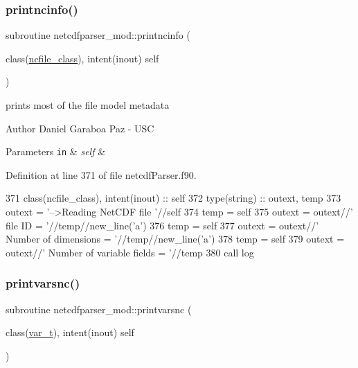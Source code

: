 \subsubsection{\texorpdfstring{printncinfo()}{printncinfo()}}
{\footnotesize\ttfamily subroutine netcdfparser\+\_\+mod\+::printncinfo (\begin{DoxyParamCaption}\item[{class(\mbox{\hyperlink{structnetcdfparser__mod_1_1ncfile__class}{ncfile\+\_\+class}}), intent(inout)}]{self }\end{DoxyParamCaption})\hspace{0.3cm}{\ttfamily [private]}}



prints most of the file model metadata 

\begin{DoxyAuthor}{Author}
Daniel Garaboa Paz -\/ U\+SC 
\end{DoxyAuthor}

\begin{DoxyParams}[1]{Parameters}
\mbox{\tt in}  & {\em self} & \\
\hline
\end{DoxyParams}


Definition at line 371 of file netcdf\+Parser.\+f90.


\begin{DoxyCode}
371     \textcolor{keywordtype}{class}(ncfile\_class), \textcolor{keywordtype}{intent(inout)} :: self
372     \textcolor{keywordtype}{type}(string) :: outext, temp
373     outext = \textcolor{stringliteral}{'-->Reading NetCDF file '}//self%
374     temp = self%
375     outext = outext//\textcolor{stringliteral}{'       file ID = '}//temp//new\_line(\textcolor{stringliteral}{'a'})
376     temp = self%
377     outext = outext//\textcolor{stringliteral}{'       Number of dimensions = '}//temp//new\_line(\textcolor{stringliteral}{'a'})
378     temp = self%
379     outext = outext//\textcolor{stringliteral}{'       Number of variable fields = '}//temp
380     \textcolor{keyword}{call }log%
\end{DoxyCode}
\mbox{\label{namespacenetcdfparser__mod_a6b57fa47d7bd796c75483216a51e5e04}} 
\subsubsection{\texorpdfstring{printvarsnc()}{printvarsnc()}}
{\footnotesize\ttfamily subroutine netcdfparser\+\_\+mod\+::printvarsnc (\begin{DoxyParamCaption}\item[{class(\mbox{\hyperlink{structnetcdfparser__mod_1_1var__t}{var\+\_\+t}}), intent(inout)}]{self }\end{DoxyParamCaption})\hspace{0.3cm}{\ttfamily [private]}}



